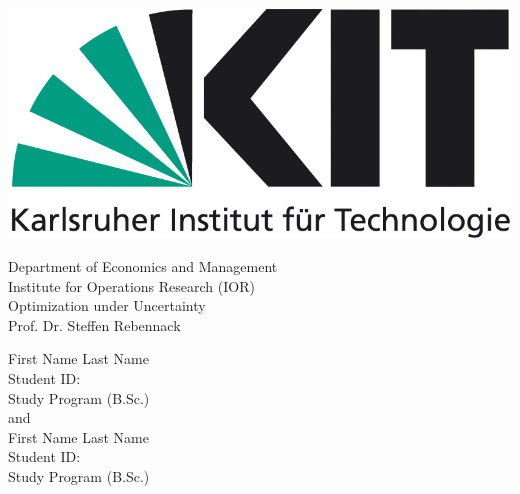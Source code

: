 \documentclass[a4paper,12pt]{article}
\begin{document}
\begin{titlepage}
    \begin{center}
        \vspace*{-80pt}

        \includegraphics[scale=0.25]{img/kit_logo.png}

        \vspace*{40pt}

        Department of Economics and Management \\[1ex]
        Institute for Operations Research (IOR) \\[1ex]
        Optimization under Uncertainty \\[1ex]

        Prof. Dr. Steffen Rebennack          

        \vspace*{25pt}   

        \vspace*{35pt}

        \fboxsep 40pt
        \fboxrule 6pt

        \vspace*{40pt}

        \normalsize

        First Name Last Name\\
        Student ID:\\
        Study Program (B.Sc.)\\[4ex]

        and \\[4ex]

        First Name Last Name\\
        Student ID:\\
        Study Program (B.Sc.)\\[4ex]

    \end{center}
\end{titlepage}
\end{document}
